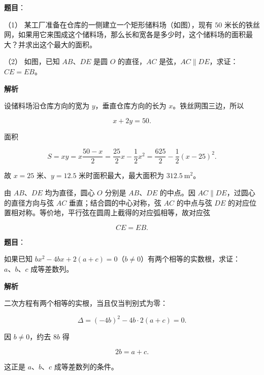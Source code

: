 \begin{answer}

\textbf{题目}：

（1） 某工厂准备在仓库的一侧建立一个矩形储料场（如图），现有 $50$ 米长的铁丝网，如果用它来围成这个储料场，那么长和宽各是多少时，这个储料场的面积最大？并求出这个最大的面积。
\nopagebreak[4]
\begin{center}\end{center}
\nopagebreak[4]
（2） 如图，已知 $AB\text{、}DE$ 是圆 $O$ 的直径，$AC$ 是弦，$AC\parallel DE$，求证：$CE=EB$。
\nopagebreak[4]
\begin{center}\end{center}
\nopagebreak[4]
\textbf{解析}


设储料场沿仓库方向的宽为 $y$，垂直仓库方向的长为 $x$。铁丝网围三边，所以

\nopagebreak[4]
\[
x+2y=50.
\]

面积

\nopagebreak[4]
\[
S=xy=x\frac{50-x}{2}=\frac{25}{2}x-\frac12x^2
=\frac{625}{2}-\frac12(x-25)^2.
\]

故 $x=25$ 米、$y=12.5$ 米时面积最大，最大面积为 $312.5\ \mathrm{m^2}$。


由 $AB\text{、}DE$ 均为直径，圆心 $O$ 分别是 $AB\text{、}DE$ 的中点。因 $AC\parallel DE$，过圆心的直径方向与弦 $AC$ 垂直；结合圆的中心对称，弦 $AC$ 的中点与弦 $DE$ 的对应位置相对称。等价地，平行弦在圆周上截得的对应弧相等，故对应弦

\nopagebreak[4]
\[
CE=EB.
\]



\end{answer}
\begin{answer}

\textbf{题目}：

如果已知 $bx^2-4bx+2(a+c)=0$（$b\ne0$）有两个相等的实数根，求证：$a\text{、}b\text{、}c$ 成等差数列。

\textbf{解析}

二次方程有两个相等的实根，当且仅当判别式为零：

\nopagebreak[4]
\[
\Delta=(-4b)^2-4b\cdot2(a+c)=0.
\]

因 $b\ne0$，约去 $8b$ 得

\nopagebreak[4]
\[
2b=a+c.
\]

这正是 $a\text{、}b\text{、}c$ 成等差数列的条件。


\end{answer}

